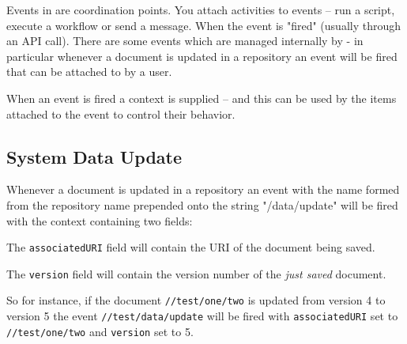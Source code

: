 Events in \Rapture are coordination points. You attach activities to events -- run a script, execute a workflow or send a message.
When the event is "fired" (usually through an API call). There are some events which are managed internally by \Rapture - in particular whenever a
document is updated in a repository an event will be fired that can be attached to by a user.

When an event is fired a context is supplied -- and this can be used by the items attached to the event to control their behavior.

\subsection{System Data Update}
Whenever a document is updated in a repository an event with the name formed from the repository name prepended onto the
string "/data/update" will be fired with the context containing two fields:

The \verb+associatedURI+ field will contain the URI of the document being saved.

The \verb+version+ field will contain the version number of the \emph{just saved} document.

So for instance, if the document \verb+//test/one/two+ is updated from version 4 to version 5 the event
\verb+//test/data/update+ will be fired with \verb+associatedURI+ set to \verb+//test/one/two+ and \verb+version+ set to 5.
